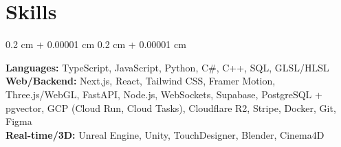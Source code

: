 \documentclass[10pt, letterpaper]{article}
\newenvironment{onecolentry}{
    \begin{adjustwidth}{
        0.2 cm + 0.00001 cm
    }{
        0.2 cm + 0.00001 cm
    }
}{
    \end{adjustwidth}
} %
\begin{document}
    \section{Skills}

    \begin{onecolentry}
        \textbf{Languages:} TypeScript, JavaScript, Python, C\#, C++, SQL, GLSL/HLSL \\
        \textbf{Web/Backend:} Next.js, React, Tailwind CSS, Framer Motion, Three.js/WebGL, FastAPI, Node.js, WebSockets, Supabase, PostgreSQL + pgvector, GCP (Cloud Run, Cloud Tasks), Cloudflare R2, Stripe, Docker, Git, Figma \\
        \textbf{Real-time/3D:} Unreal Engine, Unity, TouchDesigner, Blender, Cinema4D
    \end{onecolentry}
\end{document}
